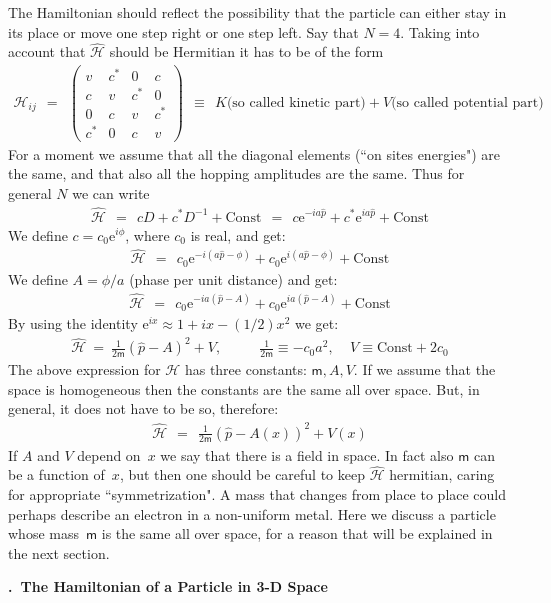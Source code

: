 \documentclass[onecolumn,fleqn, 11pt]{revtex4}
\newcommand{\eexp}{\mathrm{e}^}
\newcommand{\mass}{\mathsf{m}}
\newcommand{\amatrix}[1]{\begin{matrix} #1 \end{matrix}}
\newcommand{\beq}{\begin{eqnarray}}
\newcommand{\eeq}{\end{eqnarray}}
\renewcommand{\thesubsection}{\arabic{subsection}}
\renewcommand{\thesubsubsection}{\arabic{subsubsection}}
\newcommand{\sheadC}[1]
{
\addtocounter{subsubsection}{1}
\vspace{5mm}
{\bf \thesubsection.\thesubsubsection \ #1}  
\nopagebreak
\phantomsection
}
\begin{document}
The Hamiltonian should reflect the possibility that 
the particle can either stay in its place or
move one step right or one step left. Say that $N=4$. 
Taking into account that $\hat{\mathcal{H}}$ should be Hermitian 
it has to be of the form
\beq
\mathcal{H}_{ij} \ \ = \ \ 
\left(\amatrix{
v   & c^* & 0   & c \\ 
c   & v   & c^* & 0 \\
0   & c   & v   & c^* \\
c^* & 0   & c   & v  
}\right)
\ \ \equiv \ \ K\mbox{(so called kinetic part)} + V\mbox{(so called potential part)}
\eeq
For a moment we assume that all the diagonal elements (``on sites energies") are the same, 
and that also all the hopping amplitudes are the same. Thus for general $N$ we can write      
\beq
\hat{\mathcal{H}} 
\ \ = \ \ cD + c^*D^{-1} + \mbox{Const} 
\ \ = \ \ c\mbox{e}^{-ia\hat{p}} + c^* \mbox{e}^{ia\hat{p}} + \mbox{Const} 
\eeq
We define ${c=c_0 \eexp{i\phi}}$, where $c_0$ is real, and get:
\beq
\hat{\mathcal{H}} \ \ = \ \ c_0 \mbox{e}^{-i(a\hat{p}-\phi)} + c_0 \mbox{e}^{i(a\hat{p}-\phi)} + \mbox{Const} 
\eeq
We define ${A= \phi / a}$ (phase per unit distance) and get:
\beq
\hat{\mathcal{H}} \ \ = \ \ c_0 \mbox{e}^{-ia(\hat{p}-A)} + c_0 \mbox{e}^{ia(\hat{p}-A)} + \mbox{Const} 
\eeq
By using the identity ${\mbox{e}^{ix} \approx 1 + ix - (1/2)x^2}$ we get:
\beq
\hat{\mathcal{H}} \ = \ \frac{1}{2\mass} (\hat{p}-A)^2 + V, 
\ \ \ \ \ \ \ \ \ \ \ \
\frac{1}{2\mass}\equiv-c_0a^2, 
\ \ \ \ \
V \equiv \mbox{Const}+2c_0
\eeq
The above expression for $\mathcal{H}$ has three constants: ${\mass, A, V}$. 
If we assume that the space is homogeneous then the constants 
are the same all over space. But, in general, it does not 
have to be so, therefore:
\beq
\hat{\mathcal{H}} \ \ = \ \ \frac{1}{2\mass} (\hat{p}-A(x))^2 + V(x) 
\eeq
If $A$ and $V$ depend on~$x$ we say that there is a field in space. 
In fact also $\mass$ can be a function of~$x$, but then one should be careful 
to keep $\hat{\mathcal{H}}$ hermitian, caring for appropriate ``symmetrization".  
A mass that changes from place to place could perhaps describe an electron 
in a non-uniform metal. Here we discuss a particle whose mass~$\mass$ 
is the same all over space, for a reason that will be explained in the next section.

 
\sheadC{The Hamiltonian of a Particle in 3-D Space} 
\end{document}
